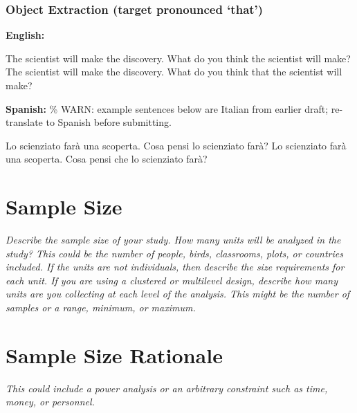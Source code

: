 \documentclass[12pt]{article}
\begin{document}
\subsubsection{Object Extraction (target pronounced `that')}

\begin{exe}
    \ex \textbf{English:}
    \begin{xlist}
        \ex The scientist will make the discovery. What do you think the scientist will make?
        \ex The scientist will make the discovery. What do you think that the scientist will make?
    \end{xlist}
    \ex \textbf{Spanish:} \% WARN: example sentences below are Italian from earlier draft; re-translate to Spanish before submitting.
    \begin{xlist}
        \ex Lo scienziato far\`a una scoperta. Cosa pensi lo scienziato far\`a?
        \ex Lo scienziato far\`a una scoperta. Cosa pensi che lo scienziato far\`a?
    \end{xlist}
\end{exe}

\section{Sample Size}

\textit{Describe the sample size of your study. How many units will be analyzed in the study? This could be the number of people, birds, classrooms, plots, or countries included. If the units are not individuals, then describe the size requirements for each unit. If you are using a clustered or multilevel design, describe how many units are you collecting at each level of the analysis. This might be the number of samples or a range, minimum, or maximum.}

\section{Sample Size Rationale}

\textit{This could include a power analysis or an arbitrary constraint such as time, money, or personnel.}

\end{document}
